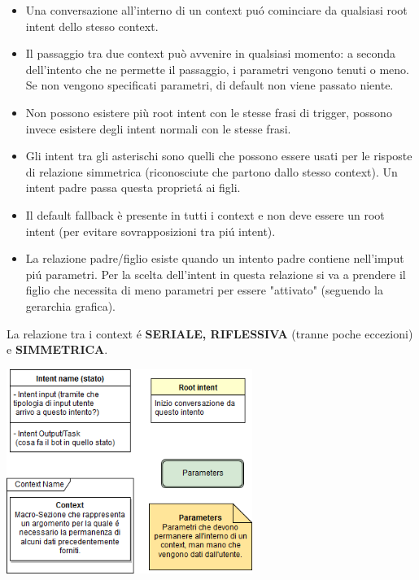\documentclass[]{article}
\begin{document}
\begin{itemize}
\item Una conversazione all'interno di un context puó cominciare da qualsiasi root intent dello stesso context.
\item Il passaggio tra due context può avvenire in qualsiasi momento: a seconda dell'intento che ne permette il passaggio, i parametri vengono tenuti o meno. Se non vengono specificati parametri, di default non viene passato niente.
\item Non possono esistere più root intent con le stesse frasi di trigger, possono invece esistere degli intent normali con le stesse frasi.
\item Gli intent tra gli asterischi sono quelli che possono essere usati per le risposte di relazione simmetrica (riconosciute che partono dallo stesso context). Un intent padre passa questa proprietá ai figli.
\item Il default fallback è presente in tutti i context e non deve essere un root intent (per evitare sovrapposizioni tra piú intent).
\item La relazione padre/figlio esiste quando un intento padre contiene nell'imput piú parametri. Per la scelta dell'intent in questa relazione si va a prendere il figlio che necessita di meno parametri per essere "attivato" (seguendo la gerarchia grafica).
\end{itemize}

La relazione tra i context é \textbf{SERIALE, RIFLESSIVA} (tranne poche eccezioni) e \textbf{SIMMETRICA}.

\begin{center}
\vspace*{0.5cm}
\includegraphics[width=0.6\textwidth]{flow2legend}
\end{center}
\end{document}
